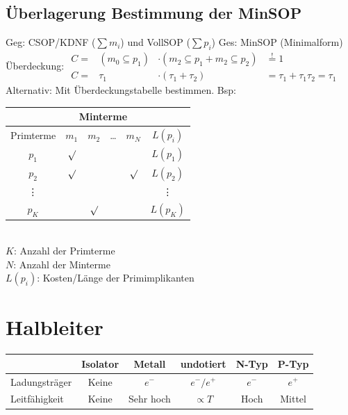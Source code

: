 \documentclass[6pt,a4paper]{scrartcl}
\begin{document}
\begin{multicols*}{3}
	\subsection{Überlagerung Bestimmung der MinSOP}
	Geg: CSOP/KDNF ($\sum m_i$) und VollSOP ($\sum p_i$) \qquad Ges: MinSOP (Minimalform)\\
	Überdeckung: $\begin{array}{rccl} C = & (m_0 \subseteq p_1) & \cdot (m_2 \subseteq p_1 + m_2 \subseteq p_2) & \stackrel{!}=1 \\ C = & \tau_1 & \cdot (\tau_1 + \tau_2) & = \tau_1 + \tau_1 \tau_2 = \tau_1 \end{array}$ \\
	Alternativ: Mit Überdeckungstabelle bestimmen. Bsp:\\
	\begin{tabular}{|c|c|c|c|c|c|}
		\hline
		          &      \multicolumn{4}{c|}{Minterme}  &      \\ \hline
		Primterme &  $m_1$  &  $m_2$  & \dots &  $m_N$  & $L(p_i)$   \\ \bottomrule[1pt]
		  $p_1$   & $\surd$ &         &       &         & $L(p_1)$   \\ \hline
		  $p_2$   & $\surd$ &         &       & $\surd$ & $L(p_2)$   \\ \hline
		 \vdots   &         &         &       &         &  \vdots    \\ \hline
		  $p_K$   &         & $\surd$ &       &         & $L(p_K)$   \\ \hline
	\end{tabular} \\
	$K$: Anzahl der Primterme\\
	$N$: Anzahl der Minterme \\
	$L(p_i)$: Kosten/Länge der Primimplikanten
	
\section{Halbleiter}
\begin{tabular}{l|c|c|c|c|c}
	& Isolator & Metall & undotiert & N-Typ & P-Typ \\ \hline
	Ladungsträger & Keine & $e^-$ & $e^- / e^+$ & $e^-$ & $e^+$ \\
	Leitfähigkeit & Keine & Sehr hoch & $\propto T$ & Hoch & Mittel\\  
\end{tabular}


\end{multicols*}
\end{document}
